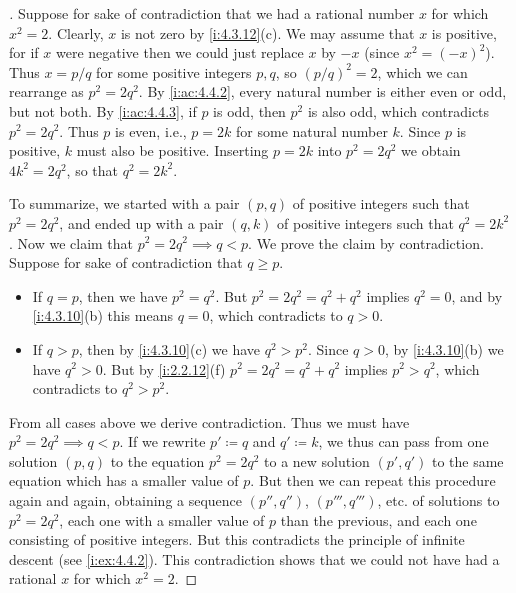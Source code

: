 \begin{proof}[]
  Suppose for sake of contradiction that we had a rational number \(x\) for which \(x^2 = 2\).
  Clearly, \(x\) is not zero by \cref{i:4.3.12}(c).
  We may assume that \(x\) is positive, for if \(x\) were negative then we could just replace \(x\) by \(-x\)
  (since \(x^2 = (-x)^2\)).
  Thus \(x = p / q\) for some positive integers \(p, q\), so \((p / q)^2 = 2\), which we can rearrange as \(p^2 = 2q^2\).
  By \cref{i:ac:4.4.2}, every natural number is either even or odd, but not both.
  By \cref{i:ac:4.4.3}, if \(p\) is odd, then \(p^2\) is also odd, which contradicts \(p^2 = 2q^2\).
  Thus \(p\) is even, i.e., \(p = 2k\) for some natural number \(k\).
  Since \(p\) is positive, \(k\) must also be positive.
  Inserting \(p = 2k\) into \(p^2 = 2q^2\) we obtain \(4k^2 = 2q^2\), so that \(q^2 = 2k^2\).

  To summarize, we started with a pair \((p, q)\) of positive integers such that \(p^2 = 2q^2\), and ended up with a pair \((q, k)\) of positive integers such that \(q^2 = 2k^2\).
  Now we claim that \(p^2 = 2q^2 \implies q < p\).
  We prove the claim by contradiction.
  Suppose for sake of contradiction that \(q \geq p\).
  \begin{itemize}
    \item If \(q = p\), then we have \(p^2 = q^2\).
          But \(p^2 = 2q^2 = q^2 + q^2\) implies \(q^2 = 0\), and by \cref{i:4.3.10}(b) this means \(q = 0\), which contradicts to \(q > 0\).
    \item If \(q > p\), then by \cref{i:4.3.10}(c) we have \(q^2 > p^2\).
          Since \(q > 0\), by \cref{i:4.3.10}(b) we have \(q^2 > 0\).
          But by \cref{i:2.2.12}(f) \(p^2 = 2q^2 = q^2 + q^2\) implies \(p^2 > q^2\), which contradicts to \(q^2 > p^2\).
  \end{itemize}
  From all cases above we derive contradiction.
  Thus we must have \(p^2 = 2q^2 \implies q < p\).
  If we rewrite \(p' \coloneqq q\) and \(q' \coloneqq k\), we thus can pass from one solution \((p, q)\) to the equation \(p^2 = 2q^2\) to a new solution \((p', q')\) to the same equation which has a smaller value of \(p\).
  But then we can repeat this procedure again and again, obtaining a sequence \((p'', q'')\), \((p''', q''')\), etc. of solutions to \(p^2 = 2q^2\), each one with a smaller value of \(p\) than the previous, and each one consisting of positive integers.
  But this contradicts the principle of infinite descent (see \cref{i:ex:4.4.2}).
  This contradiction shows that we could not have had a rational \(x\) for which \(x^2 = 2\).
\end{proof}

